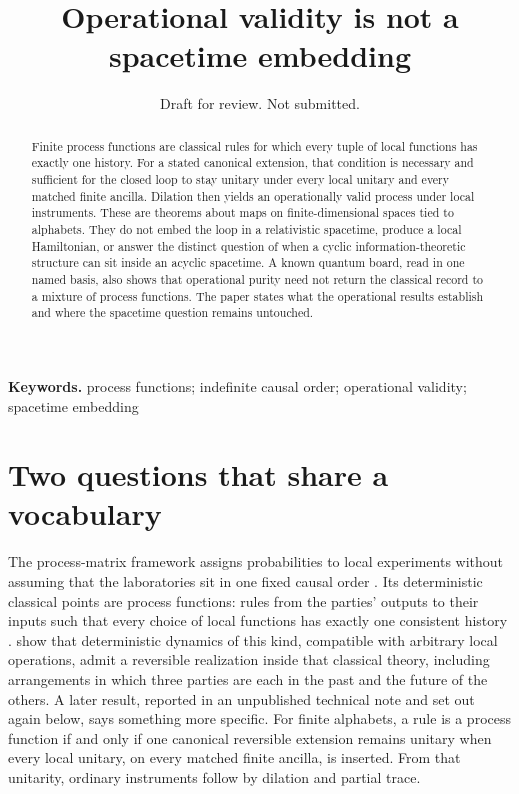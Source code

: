\documentclass[11pt]{article}
\title{Operational validity is not a spacetime embedding}
\author{}
\date{Draft for review. Not submitted.}
\begin{document}
\maketitle

\begin{abstract}
Finite process functions are classical rules for which every tuple of local functions has exactly one history. For a stated canonical extension, that condition is necessary and sufficient for the closed loop to stay unitary under every local unitary and every matched finite ancilla. Dilation then yields an operationally valid process under local instruments. These are theorems about maps on finite-dimensional spaces tied to alphabets. They do not embed the loop in a relativistic spacetime, produce a local Hamiltonian, or answer the distinct question of when a cyclic information-theoretic structure can sit inside an acyclic spacetime. A known quantum board, read in one named basis, also shows that operational purity need not return the classical record to a mixture of process functions. The paper states what the operational results establish and where the spacetime question remains untouched.
\end{abstract}

\noindent\textbf{Keywords.} process functions; indefinite causal order; operational validity; spacetime embedding

\section{Two questions that share a vocabulary}
\label{sec:two}

The process-matrix framework assigns probabilities to local experiments without assuming that the laboratories sit in one fixed causal order \citep{oreshkov2012}. Its deterministic classical points are process functions: rules from the parties' outputs to their inputs such that every choice of local functions has exactly one consistent history \citep{baumeler2016}. \citet{baumeler2019} show that deterministic dynamics of this kind, compatible with arbitrary local operations, admit a reversible realization inside that classical theory, including arrangements in which three parties are each in the past and the future of the others. A later result, reported in an unpublished technical note and set out again below, says something more specific. For finite alphabets, a rule is a process function if and only if one canonical reversible extension remains unitary when every local unitary, on every matched finite ancilla, is inserted. From that unitarity, ordinary instruments follow by dilation and partial trace.
\end{document}
